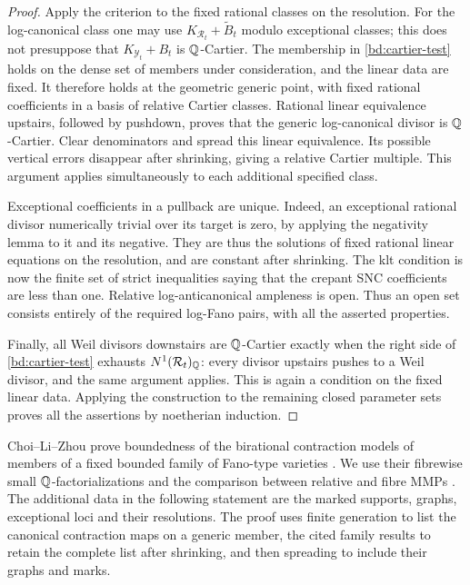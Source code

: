 \begin{proof}
Apply the criterion to the fixed rational classes on the resolution.
For the log-canonical class one may use
$K_{\mathcal R_t}+\widetilde B_t$ modulo exceptional classes; this
does not presuppose that $K_{\mathcal Y_t}+B_t$ is $\mathbb Q$-Cartier.
The membership in \eqref{bd:cartier-test} holds on the dense set of
members under consideration, and the linear data are fixed.  It
therefore holds at the geometric generic point, with fixed rational
coefficients in a basis of relative Cartier classes.  Rational linear
equivalence upstairs, followed by pushdown, proves that the generic
log-canonical divisor is $\mathbb Q$-Cartier.  Clear denominators and spread
this linear equivalence.  Its possible vertical errors disappear
after shrinking, giving a relative Cartier multiple.  This argument
applies simultaneously to each additional specified class.

Exceptional coefficients in a pullback are unique.  Indeed, an
exceptional rational divisor numerically trivial over its target is
zero, by applying the negativity lemma to it and its negative.
They are thus the solutions of fixed rational linear equations on
the resolution, and are constant after shrinking.  The klt condition
is now the finite set of strict inequalities saying that the crepant
SNC coefficients are less than one.  Relative log-anticanonical
ampleness is open.  Thus an open set consists entirely of the required
log-Fano pairs, with all the asserted properties.

Finally, all Weil divisors downstairs are $\mathbb Q$-Cartier exactly when
the right side of \eqref{bd:cartier-test} exhausts
$N^1(\mathcal R_t)_{\mathbb Q}$: every divisor upstairs pushes to a Weil
divisor, and the same argument applies.  This is again a condition
on the fixed linear data.  Applying the construction to the
remaining closed parameter sets proves all the assertions by
noetherian induction.
\end{proof}

Choi--Li--Zhou prove boundedness of the birational contraction models
of members of a fixed bounded family of Fano-type varieties
\cite[Theorem~1.7 and Section~5.1]{CLZ26}.
We use their fibrewise small $\mathbb Q$-factorializations and the comparison
between relative and fibre MMPs
\cite[Theorems~1.4--1.6 and Lemma~5.5]{CLZ26}.
The additional data in the following statement are the marked supports,
graphs, exceptional loci and their resolutions.
The proof uses finite generation to list the canonical contraction
maps on a generic member, the cited family results to retain the
complete list after shrinking, and then spreading to include their
graphs and marks.

